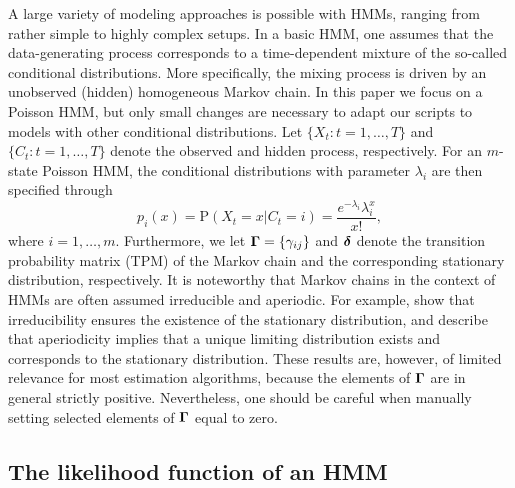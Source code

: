 \documentclass[bimj,fleqn]{w-art}\usepackage[]{graphicx}\usepackage[]{color}
\newcommand{\bgamma}{\mbox{\boldmath $\Gamma$}}
\newcommand{\bfdelta}{\mbox{\boldmath $\delta$}}
\theoremstyle{plain}
\theoremstyle{definition}
\begin{document}
A large variety of modeling approaches is possible with HMMs, ranging from rather simple to highly complex setups.
In a basic HMM, one assumes that the data-generating process corresponds to a time-dependent mixture of the so-called conditional distributions.
More specifically, the mixing process is driven by an unobserved (hidden) homogeneous Markov chain.
In this paper we focus on a Poisson HMM, but only small changes are necessary to adapt our scripts to models with other conditional distributions.
Let $\{X_t: t = 1, \ldots, T\}$ and $\{C_t : t = 1, \ldots, T\}$ denote the observed and hidden process, respectively.
For an $m$-state Poisson HMM, the conditional distributions with parameter $\lambda_i$ are then specified through
\begin{equation*}
p_i(x) = \text{P}(X_t = x \vert C_t = i) = \frac{e^{-\lambda_i} \lambda_i^x}{x!},
\end{equation*}
where $i = 1, \ldots, m$. Furthermore, we let $\bgamma = \{\gamma_{ij}\}$ and $\bfdelta$ denote the transition probability matrix (TPM) of the Markov chain and the corresponding stationary distribution, respectively.
It is noteworthy that Markov chains in the context of HMMs are often assumed irreducible and aperiodic.
For example,
\citet[Lemma 6.3.5 on p. ~225 and Theorem 6.4.3 on p. ~227]{grimmett} show that irreducibility ensures the existence of the stationary distribution, and \citet[p. ~394]{feller} describe that aperiodicity implies that a unique limiting distribution exists and corresponds to the stationary distribution.
These results are, however, of limited relevance for most estimation algorithms, because the elements of $\bgamma$ are in general strictly positive. Nevertheless, one should be careful when manually setting selected elements of $\bgamma$ equal to zero.



\subsection{The likelihood function of an HMM}
\label{sec:hmm_likelihood}
\end{document}
